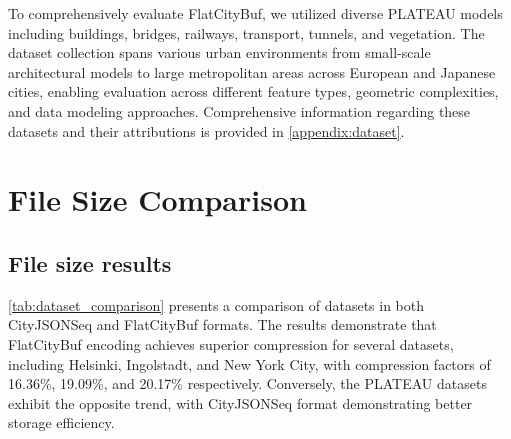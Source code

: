 To comprehensively evaluate FlatCityBuf, we utilized diverse PLATEAU models including buildings, bridges, railways, transport, tunnels, and vegetation. The dataset collection spans various urban environments from small-scale architectural models to large metropolitan areas across European and Japanese cities, enabling evaluation across different feature types, geometric complexities, and data modeling approaches. Comprehensive information regarding these datasets and their attributions is provided in \autoref{appendix:dataset}.

\section{File Size Comparison}
\label{result:file_size_comparison}

\subsection{File size results}
\label{result:overview:filesize_comparison}

\autoref{tab:dataset_comparison} presents a comparison of datasets in both CityJSONSeq and FlatCityBuf formats. The results demonstrate that FlatCityBuf encoding achieves superior compression for several datasets, including Helsinki, Ingolstadt, and New York City, with compression factors of 16.36\%, 19.09\%, and 20.17\% respectively. Conversely, the PLATEAU datasets exhibit the opposite trend, with CityJSONSeq format demonstrating better storage efficiency.

